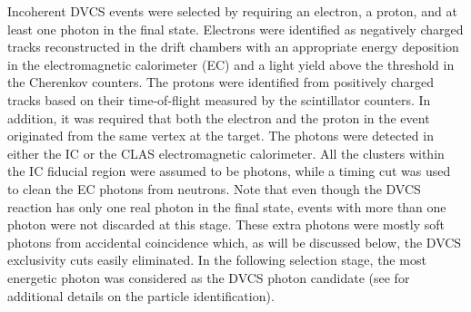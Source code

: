 \documentclass[twocolumn,nofootinbib,prl,superscriptaddress,secnumarabic,amssymb,nobibnotes,aps,floatfix]{revtex4}
\begin{document}
Incoherent DVCS events were selected by requiring an electron, a proton, and at 
least one photon in the final state. Electrons were identified as negatively 
charged tracks reconstructed in the drift chambers with an appropriate energy 
deposition in the electromagnetic calorimeter (EC) and a light yield above the 
threshold in the Cherenkov counters. The protons were identified from 
positively charged tracks based on their time-of-flight measured 
by the scintillator counters.  In addition, it was required that both the 
electron and the proton in the event originated from the same vertex at the 
target. The photons were detected in either the IC or the CLAS electromagnetic 
calorimeter. All the clusters within the IC fiducial region were assumed to be 
photons, while a timing cut was used to clean the EC photons from neutrons.  
Note that even though the DVCS reaction has only one real photon in the final 
state, events with more than one photon were not discarded at this stage. These 
extra photons were mostly soft photons from accidental coincidence which, as 
will be discussed below, the DVCS exclusivity cuts easily eliminated. In the 
following selection stage, the most energetic photon was considered as the DVCS 
photon candidate (see \cite{Hattawy:thesis} for additional details on the 
particle identification).  
\end{document}
